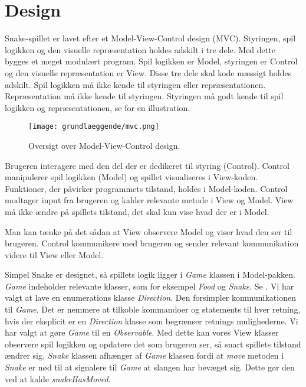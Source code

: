 \section{Design}
Snake-spillet er lavet efter et Model-View-Control design (MVC). Styringen, spil logikken og den visuelle repræsentation holdes adskilt i tre dele. Med dette bygges et meget modulært program. Spil logikken er Model, styringen er Control og den visuelle repræsentation er View. Disse tre dele skal kode mæssigt holdes adskilt. Spil logikken må ikke kende til styringen eller repræsentationen. Repræsentation må ikke kende til styringen. Styringen må godt kende til spil logikken og repræsentationen, se  for en illustration.

\begin{figure}[h]
	\centering
   	\texttt{[image: grundlaeggende/mvc.png]}
	\hspace{0.1\textwidth}
	\caption{Oversigt over Model-View-Control design.}
\end{figure}

Brugeren interagere med den del der er dedikeret til styring (Control). Control manipulerer spil logikken (Model) og spillet visualiseres i View-koden. Funktioner, der påvirker programmets tilstand, holdes i Model-koden. Control modtager input fra brugeren og kalder relevante metode i View og Model. View må ikke ændre på spillets tilstand, det skal kun vise hvad der er i Model. 

Man kan tænke på det sådan at View observere Model og viser hvad den ser til brugeren. Control kommunikere med brugeren og sender relevant kommunikation videre til View eller Model.

Simpel Snake er designet, så spillets logik ligger i \textit{Game} klassen i Model-pakken. \textit{Game} indeholder relevante klasser, som for eksempel \textit{Food} og \textit{Snake}. Se . Vi har valgt at lave en enumerations klasse \textit{Direction}. Den forsimpler kommunikationen til \textit{Game}. Det er nemmere at tilkoble kommandoer og statements til hver retning, hvis der eksplicit er en \textit{Direction} klasse som begrænser retnings mulighederne. Vi har valgt at gøre \textit{Game} til en \textit{Observable}. Med dette kan vores View klasser observere spil logikken og opdatere det som brugeren ser, så snart spillets tilstand ændrer sig. \textit{Snake} klassen afhænger af \textit{Game} klassen fordi at \textit{move} metoden i \textit{Snake} er nød til at signalere til \textit{Game} at slangen har bevæget sig. Dette gør den ved at kalde \textit{snakeHasMoved}.

